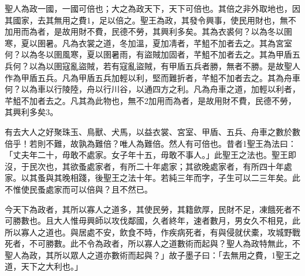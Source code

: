 
\begin{pinyinscope}
聖人為政一國，一國可倍也；大之為政天下，天下可倍也。其倍之非外取地也，因其國家，去其無用之費1，足以倍之。聖王為政，其發令興事，使民用財也，無不加用而為者，是故用財不費，民德不勞，其興利多矣。其為衣裘何？以為冬以圉寒，夏以圉暑。凡為衣裳之道，冬加溫，夏加凊者，芊䱉不加者去之。其為宮室何？以為冬以圉風寒，夏以圉暑雨，有盜賊加固者，芊䱉不加者去之。其為甲盾五兵何？以為以圉寇亂盜賊，若有寇亂盜賊，有甲盾五兵者勝，無者不勝。是故聖人作為甲盾五兵。凡為甲盾五兵加輕以利，堅而難折者，芊䱉不加者去之。其為舟車何？以為車以行陵陸，舟以行川谷，以通四方之利。凡為舟車之道，加輕以利者，芊䱉不加者去之。凡其為此物也，無不2加用而為者，是故用財不費，民德不勞，其興利多矣3。

有去大人之好聚珠玉、鳥獸、犬馬，以益衣裳、宮室、甲盾、五兵、舟車之數於數倍乎！若則不難，故孰為難倍？唯人為難倍。然人有可倍也。昔者1聖王為法曰：「丈夫年二十，毋敢不處家。女子年十五，毋敢不事人。」此聖王之法也。聖王即沒，于民次也，其欲蚤處家者，有所二十年處家；其欲晚處家者，有所四十年處家。以其蚤與其晚相踐，後聖王之法十年。若純三年而字，子生可以二三年矣。此不惟使民蚤處家而可以倍與？且不然已。

今天下為政者，其所以寡人之道多，其使民勞，其籍歛厚，民財不足，凍餓死者不可勝數也。且大人惟毋興師以攻伐鄰國，久者終年，速者數月，男女久不相見，此所以寡人之道也。與居處不安，飲食不時，作疾病死者，有與侵就伏橐，攻城野戰死者，不可勝數。此不令為政者，所以寡人之道數術而起與？聖人為政特無此，不聖人為政，其所以眾人之道亦數術而起與？」故子墨子曰：「去無用之費，1聖王之道，天下之大利也。」


\end{pinyinscope}